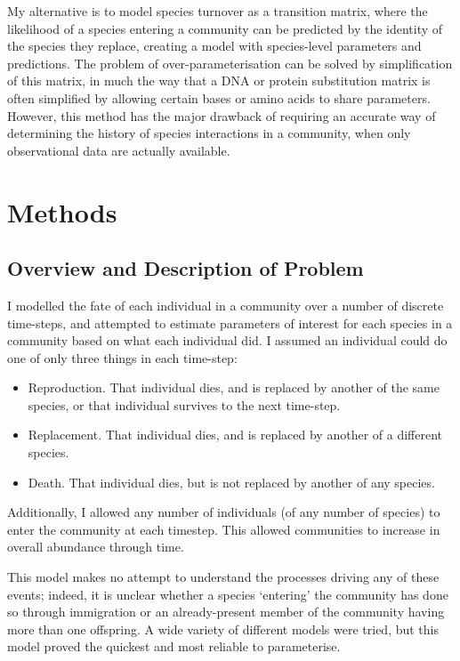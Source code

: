 \documentclass[12pt]{amsart}
\begin{document}
My alternative is to model species turnover as a transition matrix, where the likelihood of a species entering a community can be predicted by the identity of the species they replace, creating a model with species-level parameters and predictions. The problem of over-parameterisation can be solved by simplification of this matrix, in much the way that a DNA or protein substitution matrix is often simplified by allowing certain bases or amino acids to share parameters. However, this method has the major drawback of requiring an accurate way of determining the history of species interactions in a community, when only observational data are actually available.

\section{Methods}
\subsection{Overview and Description of Problem}
I modelled the fate of each individual in a community over a number of discrete time-steps, and attempted to estimate parameters of interest for each species in a community based on what each individual did. I assumed an individual could do one of only three things in each time-step:
\begin{itemize}
\item Reproduction. That individual dies, and is replaced by another of the same species, or that individual survives to the next time-step.
\item Replacement. That individual dies, and is replaced by another of a different species.
\item Death. That individual dies, but is not replaced by another of any species.
\end{itemize}

Additionally, I allowed any number of individuals (of any number of species) to enter the community at each timestep. This allowed communities to increase in overall abundance through time.

This model makes no attempt to understand the processes driving any of these events; indeed, it is unclear whether a species `entering' the community has done so through immigration or an already-present member of the community having more than one offspring. A wide variety of different models were tried, but this model proved the quickest and most reliable to parameterise.
\end{document}
